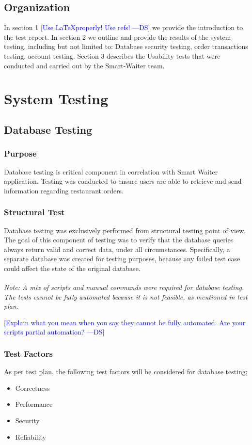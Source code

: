 \documentclass[12pt, titlepage]{article}
\newcommand{\authornote}[3]{\textcolor{#1}{[#3 ---#2]}}
\newcommand{\authornote}[3]{}
\newcommand{\ds}[1]{\authornote{blue}{DS}{#1}}
\begin{document}
\subsection{Organization}
In section 1
\ds{Use \LaTeX properly! Use refs!}
we provide the introduction to the test report. In section 2 we outline and provide the results of the system testing, including but not limited to: Database security testing, order transactions testing, account testing. Section 3 describes the Usability tests that were conducted and carried out by the Smart-Waiter team.
 
\section{System Testing} 


\subsection{Database Testing}

\subsubsection{Purpose}
Database testing is critical component in correlation with Smart Waiter application. Testing was conducted to ensure users are able to retrieve and send information regarding restaurant orders.

\subsubsection{Structural Test}
Database testing was exclusively performed from structural testing point of view. The goal of this component of testing was to verify that the database queries always return valid and correct data, under all circumstances. Specifically, a separate database was created for testing purposes, because any failed test case could affect the state of the original database.\\\\
\emph{Note: A mix of scripts and manual commands were required for database testing. The tests cannot be fully automated because it is not feasible, as mentioned in test plan.}

\ds{Explain what you mean when you say they cannot be fully automated. 
Are your scripts partial automation?}

\subsubsection{Test Factors}
As per test plan, the following test factors will be considered for database testing;
\begin{itemize}
 \item Correctness
 \item Performance
 \item Security
 \item Reliability
 \end{itemize}
\end{document}
